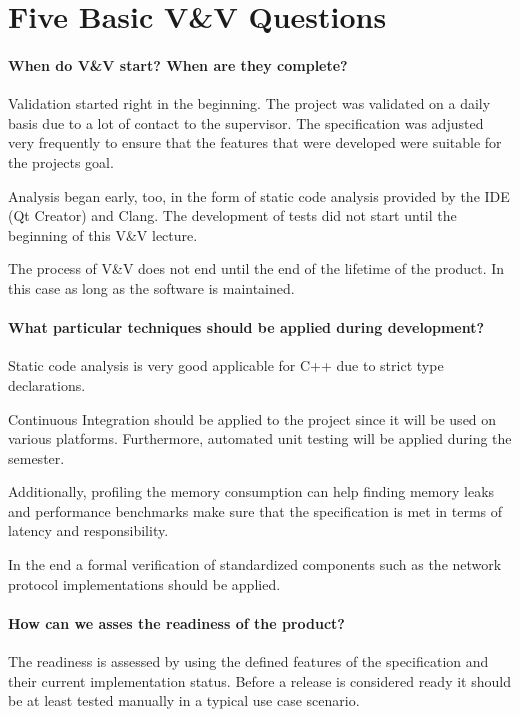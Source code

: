\documentclass{scrreprt}
\begin{document}
\section{Five Basic V\&V Questions}

\paragraph{When do V\&V start?  When are they complete?}

Validation started right in the beginning. The project was validated on a daily basis  due to a lot of contact to the supervisor. The specification was adjusted very frequently to ensure that the features that were developed were suitable for the projects goal.

Analysis began early, too, in the form of static code analysis provided by the IDE (Qt Creator) and Clang. The development of tests did not start until the beginning of this V\&V lecture.

The process of V\&V does not end until the end of the lifetime of the product. In this case as long as the software is maintained.

\paragraph{What particular techniques should be applied during development?}

Static code analysis is very good applicable for C++ due to strict type declarations. 

Continuous Integration should be applied to the project since it will be used on various platforms. Furthermore, automated unit testing will be applied during the semester.

Additionally, profiling the memory consumption can help finding memory leaks and performance benchmarks make sure that the specification is met in terms of latency and responsibility.

In the end a formal verification of standardized components such as the network protocol implementations should be applied.

\paragraph{How can we asses the readiness of the product?}

The readiness is assessed by using the defined features of the specification and their current implementation status. Before a release is considered ready it should be at least tested manually in a typical use case scenario.
\end{document}
